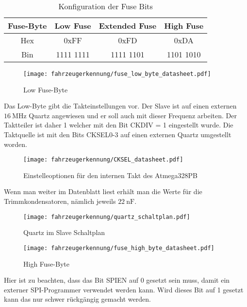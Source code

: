 \begin{table}[H]
    \centering
    \begin{tabular}{|c|c|c|c|}
        \hline
        Fuse-Byte & \textbf{Low Fuse} & \textbf{Extended Fuse} & \textbf{High Fuse} \\ \hline
        Hex       & 0xFF              & 0xFD                   & 0xDA               \\ \hline
        Bin       & 1111 1111         & 1111 1101              & 1101 1010          \\ \hline
    \end{tabular}
    \caption{Konfiguration der Fuse Bits}
\end{table}


\begin{figure}[H]
    \centering
    \texttt{[image: fahrzeugerkennung/fuse\_low\_byte\_datasheet.pdf]}
    \caption{Low Fuse-Byte}
\end{figure}

Das Low-Byte gibt die Takteinstellungen vor. Der Slave ist auf einen externen $\SI{16}{\mega\hertz}$ Quartz angewiesen und er soll auch mit dieser Frequenz arbeiten. 
Der Taktteiler ist daher 1 welcher mit den Bit CKDIV = 1 eingestellt wurde. Die Taktquelle ist mit den Bits CKSEL0-3 auf einen externen Quartz umgestellt worden.

\begin{figure}[H]
    \centering
    \texttt{[image: fahrzeugerkennung/CKSEL\_datasheet.pdf]}
    \caption{Einstelleoptionen für den internen Takt des Atmega328PB}
\end{figure}

Wenn man weiter im Datenblatt liest erhält man die Werte für die Trimmkondensatoren, nämlich jeweils $\SI{22}{\nano\farad}$.

\begin{figure}[H]
    \centering
    \texttt{[image: fahrzeugerkennung/quartz\_schaltplan.pdf]}
    \caption{Quartz im Slave Schaltplan}
\end{figure}



\begin{figure}[H]
    \centering
    \texttt{[image: fahrzeugerkennung/fuse\_high\_byte\_datasheet.pdf]}
    \caption{High Fuse-Byte}
\end{figure}

Hier ist zu beachten, dass das Bit SPIEN auf 0 gesetzt sein muss, damit ein externer SPI-Programmer verwendet werden kann. Wird dieses Bit auf 1 gesetzt kann das nur schwer rückgängig gemacht werden.

